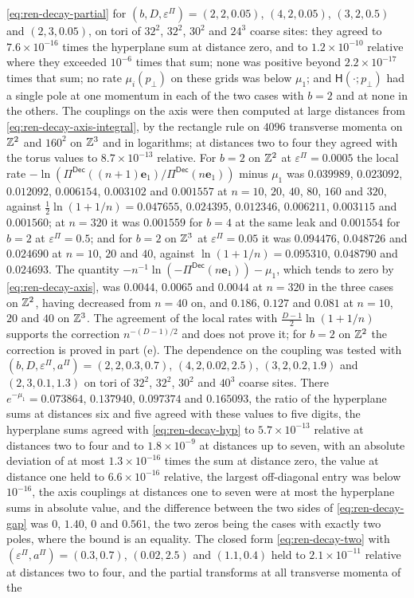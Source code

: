 \begin{numcheck}
\eqref{eq:ren-decay-partial} for $(b,D,\varepsilon^\Pi)=(2,2,0.05)$, $(4,2,0.05)$, $(3,2,0.5)$ and $(2,3,0.05)$, on tori of $32^2$, $32^2$, $30^2$ and $24^3$ coarse sites: they agreed to $7.6\times10^{-16}$ times the hyperplane sum at distance zero, and to $1.2\times10^{-10}$ relative where they exceeded $10^{-6}$ times that sum; none was positive beyond $2.2\times10^{-17}$ times that sum; no rate $\mu_i(p_\perp)$ on these grids was below $\mu_1$; and $\mathsf H(\cdot;p_\perp)$ had a single pole at one momentum in each of the two cases with $b=2$ and at none in the others. The couplings on the axis were then computed at large distances from \eqref{eq:ren-decay-axis-integral}, by the rectangle rule on $4096$ transverse momenta on $\mathbb{Z}^2$ and $160^2$ on $\mathbb{Z}^3$ and in logarithms; at distances two to four they agreed with the torus values to $8.7\times10^{-13}$ relative. For $b=2$ on $\mathbb{Z}^2$ at $\varepsilon^\Pi=0.0005$ the local rate $-\ln(\Pi^{\mathsf{Dec}}((n+1)\mathbf e_1)/\Pi^{\mathsf{Dec}}(n\mathbf e_1))$ minus $\mu_1$ was $0.039989$, $0.023092$, $0.012092$, $0.006154$, $0.003102$ and $0.001557$ at $n=10$, $20$, $40$, $80$, $160$ and $320$, against $\frac12\ln(1+1/n)=0.047655$, $0.024395$, $0.012346$, $0.006211$, $0.003115$ and $0.001560$; at $n=320$ it was $0.001559$ for $b=4$ at the same leak and $0.001554$ for $b=2$ at $\varepsilon^\Pi=0.5$; and for $b=2$ on $\mathbb{Z}^3$ at $\varepsilon^\Pi=0.05$ it was $0.094476$, $0.048726$ and $0.024690$ at $n=10$, $20$ and $40$, against $\ln(1+1/n)=0.095310$, $0.048790$ and $0.024693$. The quantity $-n^{-1}\ln(-\Pi^{\mathsf{Dec}}(n\mathbf e_1))-\mu_1$, which tends to zero by \eqref{eq:ren-decay-axis}, was $0.0044$, $0.0065$ and $0.0044$ at $n=320$ in the three cases on $\mathbb{Z}^2$, having decreased from $n=40$ on, and $0.186$, $0.127$ and $0.081$ at $n=10$, $20$ and $40$ on $\mathbb{Z}^3$. The agreement of the local rates with $\frac{D-1}2\ln(1+1/n)$ supports the correction $n^{-(D-1)/2}$ and does not prove it; for $b=2$ on $\mathbb{Z}^2$ the correction is proved in part (e). The dependence on the coupling was tested with $(b,D,\varepsilon^\Pi,a^\Pi)=(2,2,0.3,0.7)$, $(4,2,0.02,2.5)$, $(3,2,0.2,1.9)$ and $(2,3,0.1,1.3)$ on tori of $32^2$, $32^2$, $30^2$ and $40^3$ coarse sites. There $e^{-\mu_1}=0.073864$, $0.137940$, $0.097374$ and $0.165093$, the ratio of the hyperplane sums at distances six and five agreed with these values to five digits, the hyperplane sums agreed with \eqref{eq:ren-decay-hyp} to $5.7\times10^{-13}$ relative at distances two to four and to $1.8\times10^{-9}$ at distances up to seven, with an absolute deviation of at most $1.3\times10^{-16}$ times the sum at distance zero, the value at distance one held to $6.6\times10^{-16}$ relative, the largest off-diagonal entry was below $10^{-16}$, the axis couplings at distances one to seven were at most the hyperplane sums in absolute value, and the difference between the two sides of \eqref{eq:ren-decay-gap} was $0$, $1.40$, $0$ and $0.561$, the two zeros being the cases with exactly two poles, where the bound is an equality. The closed form \eqref{eq:ren-decay-two} with $(\varepsilon^\Pi,a^\Pi)=(0.3,0.7)$, $(0.02,2.5)$ and $(1.1,0.4)$ held to $2.1\times10^{-11}$ relative at distances two to four, and the partial transforms at all transverse momenta of the 
\end{numcheck}
